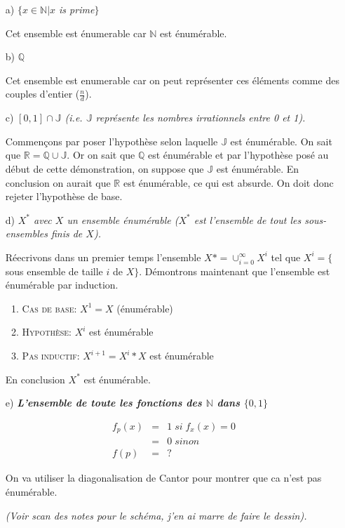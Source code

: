 \documentclass[a4paper,onecolumn,11pt]{article}
\begin{document}
\begin{itemize}
\item[a)]\textit{$\{x \in \mathbb{N}|x$ is prime$\}$}

Cet ensemble est énumerable car $\mathbb{N}$ est énumérable.

\item[b)]\textit{$\mathbb{Q}$}

Cet ensemble est enumerable car on peut représenter ces éléments comme des couples d'entier ($\frac{n}{d}$).

\item[c)]\textit{$[0,1] \cap \mathbb{J}$ (i.e. $\mathbb{J}$ représente les nombres irrationnels entre 0 et 1).}

Commençons par poser l'hypothèse selon laquelle $\mathbb{J}$ est énumérable. On sait que $\mathbb{R} = \mathbb{Q} \cup \mathbb{J}$. Or on sait que $\mathbb{Q}$ est énumérable et par l'hypothèse posé au début de cette démonstration, on suppose que $\mathbb{J}$ est énumérable. En conclusion on aurait que $\mathbb{R}$ est énumérable, ce qui est absurde. On doit donc rejeter l'hypothèse de base.

\item[d)]\textit{$X^*$ avec $X$ un ensemble énumérable ($X^*$ est l'ensemble de tout les sous-ensembles finis de $X$).}

Réecrivons dans un premier temps l'ensemble $X*=\cup^{\infty}_{i=0}X^i$ tel que $X^i = \{$sous ensemble de taille $i$ de $X\}$. Démontrons maintenant que l'ensemble est énumérable par induction.
\begin{enumerate}
	\item \textsc{Cas de base:} $X^1 = X$ (énumérable)
	\item \textsc{Hypothèse:} $X^i$ est énumérable
	\item \textsc{Pas inductif:} $X^{i+1} = X^i*X$ est énumérable
\end{enumerate}
En conclusion $X^*$ est énumérable.

\item[e)]\textit{\textbf{L'ensemble de toute les fonctions des $\mathbb{N}$ dans $\{0,1\}$}}

\begin{eqnarray*}
	f_p(x) &=& 1 \; si \; f_x(x)=0\\
	&=& 0 \; sinon \\
	f(p) &=& ?
\end{eqnarray*}

On va utiliser la diagonalisation de Cantor pour montrer que ca n'est pas énumérable.

\textit{(Voir scan des notes pour le schéma, j'en ai marre de faire le dessin).}

\end{itemize}
\end{document}
